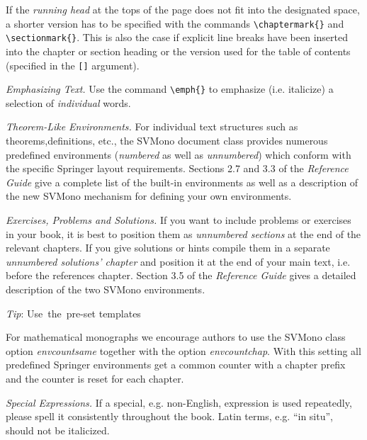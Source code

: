 \documentclass[graybox]{svmono}
\begin{document}
If the {\it running head} at the tops of the page does not fit into the designated space, a shorter version has to be specified with the commands \verb|\chaptermark{}| and \verb|\sectionmark{}|. This is also the case if explicit line breaks have been inserted into the chapter or section heading or the version used for the table of contents (specified in the \verb|[]| argument).

{\it Emphasizing Text.} Use the command \verb|\emph{}| to emphasize (i.e. italicize) a selection of {\it individual} words.

 {\it Theorem-Like Environments.} For individual text structures such as theorems,\break definitions, etc., the {\sc SVMono} document class provides numerous predefined environments ({\it numbered} as well as {\it unnumbered}) which conform with the specific Springer layout requirements. Sections 2.7 and 3.3 of the {\it Reference Guide} give a complete list of the built-in environments as well as a description of the new {\sc SVMono} mechanism for defining your own environments.

{\it Exercises, Problems and Solutions.} If you want to include problems or exercises in your book, it is best to position them as {\it unnumbered sections} at the end of the relevant chapters. If you give solutions or hints compile them in a separate {\it unnumbered solutions' chapter} and position it at the end of your main text, i.e. before the references chapter. Section 3.5 of the {\it Reference Guide} gives a detailed description of the two {\sc SVMono} environments.

\vspace*{-6pc}

\hspace*{29pc}\hbox{{\it Tip}:}
\hspace*{29pc}\hbox{Use the pre-set}
\hspace*{29pc}\hbox{templates}

\vspace*{2pc}

For mathematical monographs we encourage authors to use the {\sc SVMono} class option {\it envcountsame} together with the option {\it envcountchap}. With this setting all predefined Springer environments get a common counter with a chapter prefix and the counter is reset for each chapter.

{\it Special Expressions.} If a special, e.g. non-English, expression is used repeatedly, please spell it consistently throughout the book. Latin terms, e.g. ``in situ'', should not be italicized.
\end{document}
